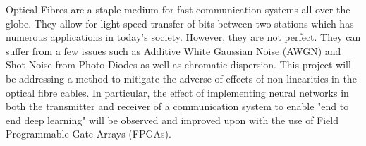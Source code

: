 
\iffalse
Think of the introduction as a development of the context for the reader.

Peruse the literature quickly. 
Highlight the historical progression of the theory and work that has been done, citing the literature as you go. 

Use the citation mechanisms in the editor you are using. 
After the reader has some idea of what the historical background is, mention what is missing in it that your proposal is going to fill.
\fi

Optical Fibres are a staple medium for fast communication systems all over the globe. They allow for light speed transfer of bits between two stations which has numerous applications in today's society. However, they are not perfect. They can suffer from a few issues such as Additive White Gaussian Noise (AWGN) and Shot Noise from Photo-Diodes as well as chromatic dispersion. This project will be addressing a method to mitigate the adverse of effects of non-linearities in the optical fibre cables. In particular, the effect of implementing neural networks in both the transmitter and receiver of a communication system to enable "end to end deep learning" will be observed and improved upon with the use of Field Programmable Gate Arrays (FPGAs).  

